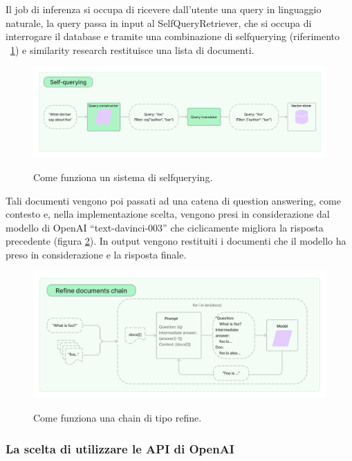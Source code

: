 Il job di inferenza si occupa di ricevere dall'utente una query in linguaggio naturale, la query passa in input al SelfQueryRetriever, 
che si occupa di interrogare il database e tramite una combinazione di selfquerying (riferimento ~\ref{fig:selfquery}) e similarity research restituisce una lista di documenti.
\begin{figure}
    \centering
    \includegraphics[width=0.7\pdfpagewidth]{images/selfquery.jpg}\label{fig:selfquery}
    \caption[Ingestion]{Come funziona un sistema di selfquerying.}
\end{figure}

Tali documenti vengono poi passati ad una catena di question answering, come contesto e, nella implementazione scelta, vengono presi in considerazione dal modello di OpenAI ``text-davinci-003'' che ciclicamente migliora la risposta precedente (figura \ref{fig:refine}).
In output vengono restituiti i documenti che il modello ha preso in considerazione e la risposta finale.

\begin{figure}
    \centering
    \includegraphics[width=0.7\pdfpagewidth]{images/refine.jpg}\label{fig:refine}
    \caption[Ingestion]{Come funziona una chain di tipo refine.}
\end{figure}

\subsubsection{La scelta di utilizzare le API di OpenAI}

